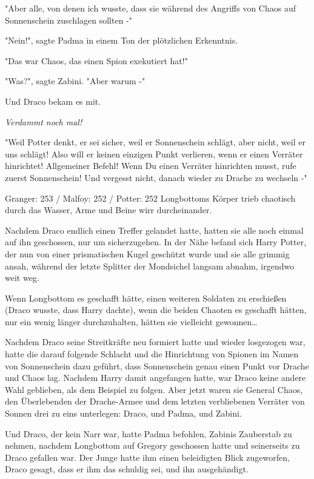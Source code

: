 {"Aber alle, von denen ich wusste, dass sie während des Angriffs von Chaos auf Sonnenschein zuschlagen sollten -"

"Nein!", sagte Padma in einem Ton der plötzlichen Erkenntnis.

"Das war Chaos, das einen Spion exekutiert hat!"

"Was?", sagte Zabini. "Aber warum -"

Und Draco bekam es mit.

\emph{Verdammt noch mal!}

"Weil Potter denkt, er sei sicher, weil er Sonnenschein schlägt, aber nicht, weil er uns schlägt! Also will er keinen einzigen Punkt verlieren, wenn er einen Verräter hinrichtet! Allgemeiner Befehl! Wenn Du einen Verräter hinrichten musst, rufe zuerst Sonnenschein! Und vergesst nicht, danach wieder zu Drache zu wechseln -"

Granger: 253 / Malfoy: 252 / Potter: 252 Longbottoms Körper trieb chaotisch durch das Wasser, Arme und Beine wirr durcheinander.

Nachdem Draco endlich einen Treffer gelandet hatte, hatten sie alle noch einmal auf ihn geschossen, nur um sicherzugehen. In der Nähe befand sich Harry Potter, der nun von einer prismatischen Kugel geschützt wurde und sie alle grimmig ansah, während der letzte Splitter der Mondsichel langsam abnahm, irgendwo weit weg.

Wenn Longbottom es geschafft hätte, einen weiteren Soldaten zu erschießen (Draco wusste, dass Harry dachte), wenn die beiden Chaoten es geschafft hätten, nur ein wenig länger durchzuhalten, hätten sie vielleicht gewonnen…

Nachdem Draco seine Streitkräfte neu formiert hatte und wieder losgezogen war, hatte die darauf folgende Schlacht und die Hinrichtung von Spionen im Namen von Sonnenschein dazu geführt, dass Sonnenschein genau einen Punkt vor Drache und Chaos lag. Nachdem Harry damit angefangen hatte, war Draco keine andere Wahl geblieben, als dem Beispiel zu folgen. Aber jetzt waren sie General Chaos, den Überlebenden der Drache-Armee und dem letzten verbliebenen Verräter von Sonnen drei zu eins unterlegen: Draco, und Padma, und Zabini.

Und Draco, der kein Narr war, hatte Padma befohlen, Zabinis Zauberstab zu nehmen, nachdem Longbottom auf Gregory geschossen hatte und seinerseits zu Draco gefallen war. Der Junge hatte ihm einen beleidigten Blick zugeworfen, Draco gesagt, dass er ihm das schuldig sei, und ihn ausgehändigt.

}

